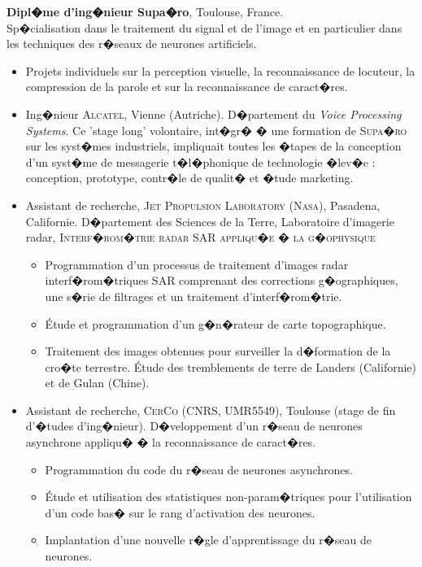 \vspace*{.3cm}
	\textbf{Dipl�me d'ing�nieur {\sc Supa�ro}}, Toulouse, France.  \hfill {}\\
Sp�cialisation dans le traitement du signal et de l'image et en particulier dans les techniques des r�seaux de neurones artificiels. \\
\vspace*{-.1in}
	\begin{itemize}
	 	\item Projets individuels sur la perception visuelle, la reconnaissance de locuteur, la compression de la parole et sur la reconnaissance de caract�res.
		\item Ing�nieur \textsc{Alcatel}, Vienne (Autriche).  D�partement du \emph{Voice Processing Systems}. Ce 'stage long' volontaire, int�gr� �  une formation de \textsc{Supa�ro} sur les syst�mes industriels, impliquait toutes les �tapes de la conception d'un syst�me de messagerie t�l�phonique de technologie �lev�e : conception, prototype, contr�le de qualit� et �tude marketing. %
		\item  Assistant de recherche, \textsc{Jet Propulsion Laboratory}  (\textsc{Nasa}), Pasadena, Californie. D�partement des Sciences de la Terre, Laboratoire d'imagerie radar, \textsc{Interf�rom�trie radar SAR appliqu�e � la g�ophysique}
		\begin{itemize}
			\item Programmation d'un processus de traitement d'images radar interf�rom�triques SAR comprenant des corrections g�ographiques, une s�rie de filtrages et un traitement d'interf�rom�trie.
			\item \'Etude et programmation d'un g�n�rateur de carte topographique.%
			\item Traitement des images obtenues pour surveiller la d�formation de la cro�te terrestre. \'Etude des tremblements de terre de Landers (Californie) et de Gulan (Chine).
		\end{itemize}
		\item Assistant de recherche, \textsc{CerCo}  (CNRS, UMR5549), Toulouse (stage de fin d'�tudes d'ing�nieur). D�veloppement d'un r�seau de neurones asynchrone appliqu� �  la reconnaissance de caract�res.
		\begin{itemize}
			\item Programmation du code du r�seau de neurones asynchrones.
			\item \'Etude et utilisation des statistiques non-param�triques %
pour l'utili\-sation d'un code bas� sur le rang d'activation des neurones. \item Implantation d'une nouvelle r�gle d'apprentissage du r�seau de neurones.
		\end{itemize} %
	\end{itemize}

